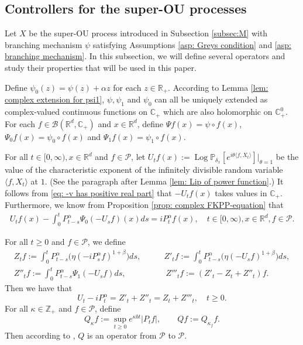 \documentclass[12pt,a4paper]{amsart}
\theoremstyle{plain}
\theoremstyle{definition}
\numberwithin{equation}{section}
\begin{document}
\subsection{Controllers for the super-OU processes}
\label{sec: h-controller}
Let $X$ be the super-OU process introduced in Subsection \ref{subsec:M} with branching mechanism $\psi$ satisfying
Assumptions \ref{asp: Greys condition} and \ref{asp: branching mechanism}.
In this subsection, we will define several operators and study their properties that will be used in this paper.

Define $\psi_0(z) = \psi(z) + \alpha z$ for each $z\in \mathbb{R}_+$.
According to Lemma \ref{lem: complex extension for psi1}, $\psi, \psi_1$ and $\psi_0$ can all be uniquely extended as complex-valued continuous functions on $\mathbb C_+$ which are also holomorphic on $\mathbb C^0_+$.
For each $f\in \mathcal B(\mathbb R^d, \mathbb C_+)$ and $x\in \mathbb R^d$, define
$\Psi f (x) = \psi\circ f(x)$, $\Psi_0 f(x)= \psi_0 \circ f(x)$ and $\Psi_1 f(x)= \psi_1 \circ f(x)$.

For all $t\in [0,\infty), x\in \mathbb R^d $ and $f \in \mathcal{P}$, let
  \(
    U_tf(x) 
  := \operatorname{Log} \mathbb P_{\delta_x}[e^{i\theta \langle f, X_t\rangle}]|_{\theta = 1}
\)
be the value of the characteristic exponent of the infinitely divisible random variable $\langle f, X_t\rangle$ at $1$.
(See the paragraph after Lemma \ref{lem: Lip of power function}.)
It follows from \eqref{eq: -v has positive real part} that $-U_tf(x)$ takes values in $\mathbb C_+$. Furthermore, we know from Proposition \ref{prop: complex FKPP-equation} that
\begin{align}
  \label{eq:chareq2}
  U_tf(x) - \int_0^t P^\alpha_{t-s} \Psi_0(-U_sf)(x)ds
  = i P^{\alpha}_t f(x)
  , \quad t\in [0,\infty), x\in \mathbb{R}^d, f\in \mathcal P.
\end{align}

For all $t\geq 0$ and $f\in \mathcal P$, we define
\begin{align}
  \label{eq: def of Zf}
  Z_t f
    := \int_0^t P^\alpha_{t-s}\big( \eta (-i P^\alpha_sf)^{1+\beta}\big)ds,
    & \qquad Z'_t f
    := \int_0^t P^\alpha_{t-s}\big( \eta (-U_s f)^{1+\beta}\big)ds,\\
   Z''_t f
    := \int_0^t P^\alpha_{t-s}\Psi_1(-U_s f)ds,
    &\qquad\  Z'''_t f
    := (Z'_t - Z_t+ Z''_t)f.
\end{align}
Then we have that
\begin{equation}
  \label{eq: key equality}
  U_t - i P^\alpha_t
  = Z'_t + Z''_t
  = Z_t + Z'''_t
  , \quad t\geq 0.
\end{equation}
For all $\kappa \in \mathbb Z_+$ and $f\in \mathcal P$, define
\begin{equation}
  \label{eq:Q}
  Q_\kappa f
  := \sup_{t\geq 0} e^{\kappa b t}|P_t f|, 
  \qquad  Q f
  := Q_{\kappa_f}f.
\end{equation}
Then according to \cite[Fact 1.2]{MarksMilos2018CLT}, $Q$ is an operator from $\mathcal P$ to $\mathcal P$.
\end{document}
